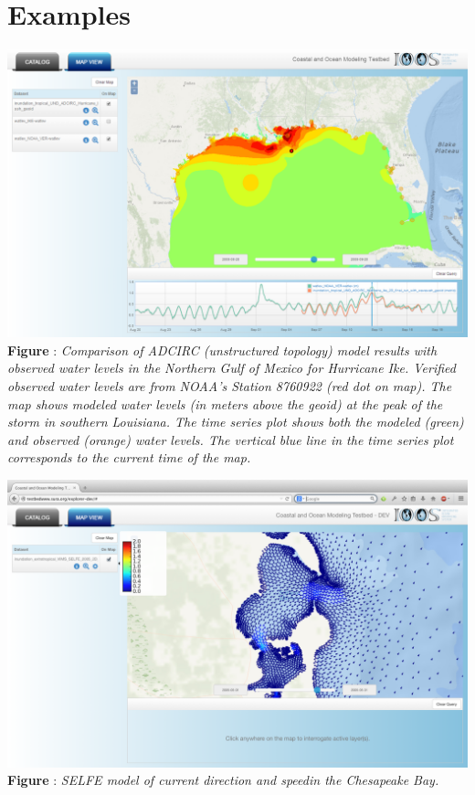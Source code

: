 \documentclass[noback,noborder,portrait,twocolumn]{cuposter}
\begin{document}
\section{Examples}
\begin{minipage}[t]{\linewidth}
  \centering
  \includegraphics[width=\linewidth]{../figs/SciWMS_ModelObsComparison}
  \textbf{Figure \getIncFigcounter{}}: \textit{Comparison of ADCIRC
    (unstructured topology) model results with observed water levels
    in the Northern Gulf of Mexico for Hurricane Ike. Verified
    observed water levels are from NOAA's Station 8760922 (red dot on
    map). The map shows modeled water levels (in meters above the
    geoid) at the peak of the storm in southern Louisiana. The time
    series plot shows both the modeled (green) and observed (orange)
    water levels. The vertical blue line in the time series plot
    corresponds to the current time of the map.}
\end{minipage}
\figspace{}
\begin{minipage}[t]{\linewidth}
  \centering
  \includegraphics[width=\linewidth]{../figs/vims_selfe_ubaratropic_vbaratropic_chesapeake_bay}
  \textbf{Figure \getIncFigcounter{}}: \textit{SELFE model of current
    direction and speedin the Chesapeake Bay.}
\end{minipage}
\end{document}
